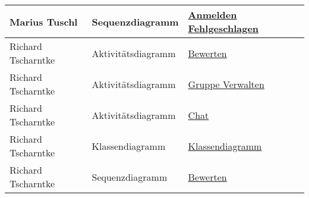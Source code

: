 \begin{tabularx}{\linewidth}{|X|X|X|}
		\hline
		Marius Tuschl&Sequenzdiagramm&\hyperref[fig:SeqDia_Anmelden_Fehlgeschlagen]{Anmelden Fehlgeschlagen}\\
		\hline
		\hline
		Richard Tscharntke&Aktivitätsdiagramm&\hyperref[fig:ActDia_Bewerten]{Bewerten}\\
		\hline
		Richard Tscharntke&Aktivitätsdiagramm&\hyperref[fig:ActDia_Gruppe_Verwalten]{Gruppe Verwalten}\\
		\hline
		Richard Tscharntke&Aktivitätsdiagramm&\hyperref[fig:ActDia_Chat]{Chat}\\
		\hline
		Richard Tscharntke&Klassendiagramm&\hyperref[fig:ClassDia_Richard]{Klassendiagramm}\\
		\hline
		Richard Tscharntke&Sequenzdiagramm&\hyperref[fig:SeqDia_Bewerten]{Bewerten}\\
		\hline
		
	\end{tabularx}